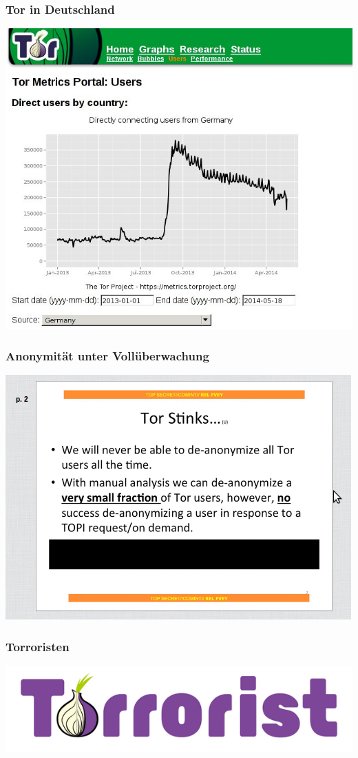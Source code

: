 \documentclass[12pt]{beamer}
\begin{document}
\begin{frame}
    \frametitle{Tor in Deutschland}
    \includegraphics[height=0.7\textheight]{img/torgermany.jpg}
\end{frame}

\begin{frame}
    \frametitle{Anonymität unter Vollüberwachung}
    \includegraphics[height=0.7\textheight]{img/torstinks.png}
\end{frame}

\begin{frame}
    \frametitle{Torroristen}
    \includegraphics[width=0.8\textheight]{img/torrorist.png}
\end{frame}
\end{document}
